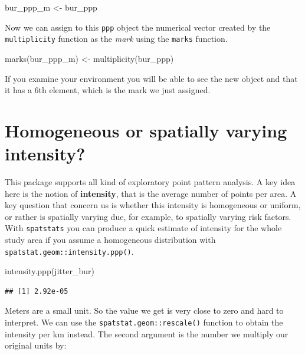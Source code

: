 \documentclass[
  krantz2]{krantz}
\makeatletter
\newenvironment{Shaded}{\begin{snugshade}}{\end{snugshade}}
\newcommand{\FunctionTok}[1]{\textcolor[rgb]{0,0,0}{#1}}
\newcommand{\NormalTok}[1]{#1}
\newcommand{\OtherTok}[1]{\textcolor[rgb]{0.37,0.37,0.37}{#1}}
\newenvironment{kframe}{%
\medskip{}
\setlength{\fboxsep}{.8em}
 \def\at@end@of@kframe{}%
 \ifinner\ifhmode%
  \def\at@end@of@kframe{\end{minipage}}%
  \begin{minipage}{\columnwidth}%
 \fi\fi%
 \def\FrameCommand##1{\hskip\@totalleftmargin \hskip-\fboxsep
 \colorbox{shadecolor}{##1}\hskip-\fboxsep
     \hskip-\linewidth \hskip-\@totalleftmargin \hskip\columnwidth}%
 \MakeFramed {\advance\hsize-\width
   \@totalleftmargin\z@ \linewidth\hsize
   \@setminipage}}%
 {\par\unskip\endMakeFramed%
 \at@end@of@kframe}
\renewenvironment{Shaded}{\begin{kframe}}{\end{kframe}}
\makeatother
\begin{document}
\begin{Shaded}
\begin{Highlighting}[]
\NormalTok{bur\_ppp\_m }\OtherTok{\textless{}{-}}\NormalTok{ bur\_ppp}
\end{Highlighting}
\end{Shaded}

Now we can assign to this \texttt{ppp} object the numerical vector created by the \texttt{multiplicity} function as the \emph{mark} using the \texttt{marks} function.

\begin{Shaded}
\begin{Highlighting}[]
\FunctionTok{marks}\NormalTok{(bur\_ppp\_m) }\OtherTok{\textless{}{-}} \FunctionTok{multiplicity}\NormalTok{(bur\_ppp)}
\end{Highlighting}
\end{Shaded}

If you examine your environment you will be able to see the new object and that it has a 6th element, which is the mark we just assigned.

\hypertarget{homogeneous-or-spatially-varying-intensity}{%
\section{Homogeneous or spatially varying intensity?}\label{homogeneous-or-spatially-varying-intensity}}

This package supports all kind of exploratory point pattern analysis. A key idea here is the notion of \textbf{intensity}, that is the average number of points per area. A key question that concern us is whether this intensity is homogeneous or uniform, or rather is spatially varying due, for example, to spatially varying risk factors. With \texttt{spatstats} you can produce a quick estimate of intensity for the whole study area if you assume a homogeneous distribution with \texttt{spatstat.geom::intensity.ppp()}.

\begin{Shaded}
\begin{Highlighting}[]
\FunctionTok{intensity.ppp}\NormalTok{(jitter\_bur)}
\end{Highlighting}
\end{Shaded}

\begin{verbatim}
## [1] 2.92e-05
\end{verbatim}

Meters are a small unit. So the value we get is very close to zero and hard to interpret. We can use the \texttt{spatstat.geom::rescale()} function to obtain the intensity per km instead. The second argument is the number we multiply our original units by:
\end{document}
